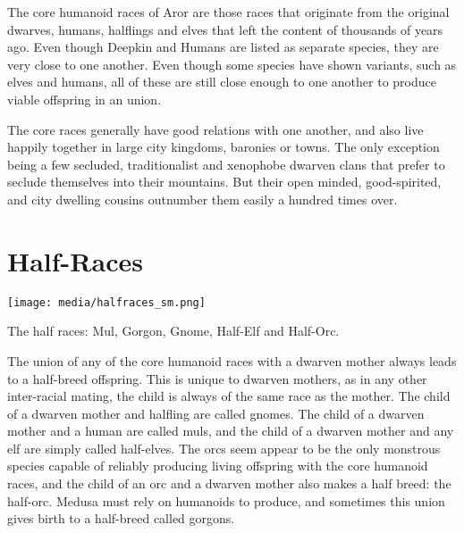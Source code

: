 The core humanoid races of Aror are those races that originate from the
original dwarves, humans, halflings and elves that left the content of
 thousands of years ago. Even though Deepkin and Humans
are listed as separate species, they are very close to one another. Even though
some species have shown variants, such as elves and humans, all of these are
still close enough to one another to produce viable offspring in an union.

The core races generally have good relations with one another, and also live
happily together in large city kingdoms, baronies or towns. The only exception
being a few secluded, traditionalist and xenophobe dwarven clans that prefer
to seclude themselves into their mountains. But their open minded,
good-spirited, and city dwelling cousins outnumber them easily a hundred times
over.







\section{Half-Races}
\label{sec:Half-Races}

\begin{figure*}[ht!]
    \centering
    \vspace{-2.6cm}
    \centerline{
        \texttt{[image: media/halfraces\_sm.png]}
    }
    \par
    The half races: Mul, Gorgon, Gnome, Half-Elf and Half-Orc.
\end{figure*}

The union of any of the core humanoid races with a dwarven mother always leads
to a half-breed offspring. This is unique to dwarven mothers, as in any other
inter-racial mating, the child is always of the same race as the mother. The
child of a dwarven mother and halfling are called gnomes. The child of a
dwarven mother and a human are called muls, and the child of a dwarven mother
and any elf are simply called half-elves. The orcs seem appear to be the only
monstrous species capable of reliably producing living offspring with the
core humanoid races, and the child of an orc and a dwarven mother also makes
a half breed: the half-orc. Medusa must rely on humanoids to produce, and
sometimes this union gives birth to a half-breed called gorgons.


